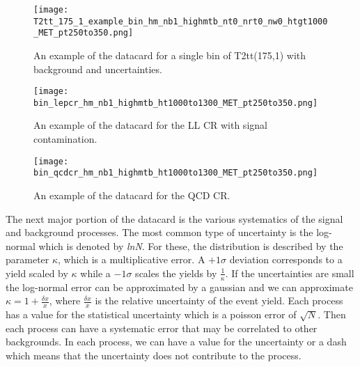 \begin{figure}
	\begin{center}
  \texttt{[image: T2tt\_175\_1\_example\_bin\_hm\_nb1\_highmtb\_nt0\_nrt0\_nw0\_htgt1000\_MET\_pt250to350.png]}
	\end{center}
	\caption[Example Datacard of T2tt(175,1)]{An example of the datacard for a single bin of T2tt(175,1) with background and uncertainties.
	 }
	\label{fig:example-datacard-sig}
\end{figure}
\begin{figure}
	\begin{center}
  \texttt{[image: bin\_lepcr\_hm\_nb1\_highmtb\_ht1000to1300\_MET\_pt250to350.png]}
	\end{center}
	\caption[Example Datacard of LL CR]{An example of the datacard for the LL CR with signal contamination.
	 }
	\label{fig:example-datacard-ll}
\end{figure}
\begin{figure}
	\begin{center}
  \texttt{[image: bin\_qcdcr\_hm\_nb1\_highmtb\_ht1000to1300\_MET\_pt250to350.png]}
	\end{center}
	\caption[Example Datacard of QCD CR]{An example of the datacard for the QCD CR.
	 }
	\label{fig:example-datacard-qcd}
\end{figure}

The next major portion of the datacard is the various systematics of the signal and background processes. The most common type of uncertainty is the log-normal which is denoted by \textit{lnN}. For these, the distribution is described by the parameter $\kappa$, which is a multiplicative error. A $+1\sigma$ deviation corresponds to a yield scaled by $\kappa$ while a $-1\sigma$ scales the yields by $\frac{1}{\kappa}$. If the uncertainties are small the log-normal error can be approximated by a gaussian and we can approximate $\kappa=1+\frac{\delta x}{x}$, where $\frac{\delta x}{x}$ is the relative uncertainty of the event yield. Each process has a value for the statistical uncertainty which is a poisson error of $\sqrt{N}$. Then each process can have a systematic error that may be correlated to other backgrounds. In each process, we can have a value for the uncertainty or a dash which means that the uncertainty does not contribute to the process. 

